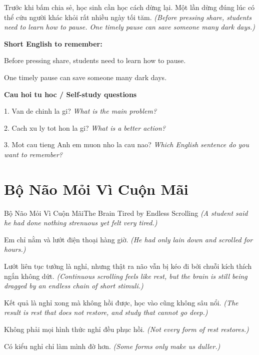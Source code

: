 \begin{baihoc}
Trước khi bấm chia sẻ, học sinh cần học cách dừng lại. Một lần dừng đúng lúc có thể cứu người khác khỏi rất nhiều ngày tối tăm.
\textit{(Before pressing share, students need to learn how to pause. One timely pause can save someone many dark days.)}
\end{baihoc}

\begin{ghinhoanh}
\textbf{Short English to remember:}

Before pressing share, students need to learn how to pause.

One timely pause can save someone many dark days.

\end{ghinhoanh}

\begin{tuhocnhanh}
\textbf{Cau hoi tu hoc / Self-study questions}

1. Van de chinh la gi? \textit{What is the main problem?}

2. Cach xu ly tot hon la gi? \textit{What is a better action?}

3. Mot cau tieng Anh em muon nho la cau nao? \textit{Which English sentence do you want to remember?}
\end{tuhocnhanh}
\ngancach

\section{Bộ Não Mỏi Vì Cuộn Mãi}
\begin{truyen}{Bộ Não Mỏi Vì Cuộn Mãi}{The Brain Tired by Endless Scrolling}
\textit{(A student said he had done nothing strenuous yet felt very tired.)}

Em chỉ nằm và lướt điện thoại hàng giờ.
\textit{(He had only lain down and scrolled for hours.)}

Lướt liên tục tưởng là nghỉ, nhưng thật ra não vẫn bị kéo đi bởi chuỗi kích thích ngắn không dứt.
\textit{(Continuous scrolling feels like rest, but the brain is still being dragged by an endless chain of short stimuli.)}

Kết quả là nghỉ xong mà không hồi được, học vào cũng không sâu nổi.
\textit{(The result is rest that does not restore, and study that cannot go deep.)}

Không phải mọi hình thức nghỉ đều phục hồi.
\textit{(Not every form of rest restores.)}

Có kiểu nghỉ chỉ làm mình đờ hơn.
\textit{(Some forms only make us duller.)}

\end{truyen}

